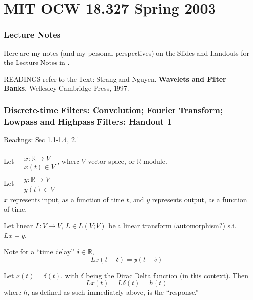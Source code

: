 \documentclass[twoside]{amsart}
\theoremstyle{plain}
\theoremstyle{definition}
\theoremstyle{remark}
\numberwithin{equation}{section}
\begin{document}
\tableofcontents

\part{MIT OCW 18.327 Spring 2003}%

\section*{Lecture Notes}

Here are my notes (and my personal perspectives) on the Slides and Handouts for the Lecture Notes in \cite{GStrangKAmaratunga2003}.  

READINGS refer to the Text: Strang and Nguyen. \textbf{Wavelets and Filter Banks}. Wellesley-Cambridge Press, 1997.\cite{GStrangTNguyen1996}

\section{Discrete-time Filters: Convolution; Fourier Transform; Lowpass and Highpass Filters: Handout 1}

Readings: Sec 1.1-1.4, 2.1 \cite{GStrangTNguyen1996}

Let $\begin{aligned}
  & \quad \\ 
  & x: \mathbb{R} \to V \\ 
  & x(t) \in V
\end{aligned}$, where $V$ vector space, or $\mathbb{R}$-module.   \\

Let $\begin{aligned}
  & \quad \\ 
  & y: \mathbb{R} \to V \\ 
  & y(t) \in V
\end{aligned}$.   \\

$x$ represents input, as a function of time $t$, and $y$ represents output, as a function of time. 

Let linear  $L:V\to V$, $L \in L(V;V)$ be a linear transform (automorphism?) s.t. $Lx=y$.  

Note for a ``time delay'' $\delta \in \mathbb{R}$, 
\[
Lx(t-\delta) = y(t-\delta)
\]

Let $x(t) = \delta(t)$, with $\delta$ being the Dirac Delta function (in this context).   Then
\[
Lx(t) = L\delta(t) =h(t)
\]
where $h$, as defined as such immediately above, is the ``response.''  
\end{document}
